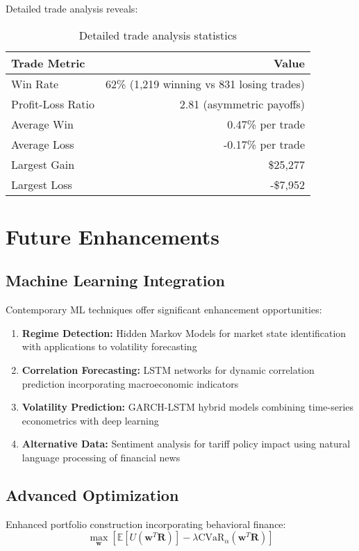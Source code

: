 \documentclass[onecolumn,11pt]{IEEEtran}
\begin{document}
Detailed trade analysis reveals:

\begin{table}[h]
\centering
\begin{tabular}{lr}
\toprule
\textbf{Trade Metric} & \textbf{Value} \\
\midrule
Win Rate & 62\% (1,219 winning vs 831 losing trades) \\
Profit-Loss Ratio & 2.81 (asymmetric payoffs) \\
Average Win & 0.47\% per trade \\
Average Loss & -0.17\% per trade \\
Largest Gain & \$25,277 \\
Largest Loss & -\$7,952 \\
\bottomrule
\end{tabular}
\caption{Detailed trade analysis statistics}
\end{table}

\section{Future Enhancements}

\subsection{Machine Learning Integration}

Contemporary ML techniques offer significant enhancement opportunities:
\begin{enumerate}
    \item \textbf{Regime Detection:} Hidden Markov Models for market state identification with applications to volatility forecasting
    \item \textbf{Correlation Forecasting:} LSTM networks for dynamic correlation prediction incorporating macroeconomic indicators
    \item \textbf{Volatility Prediction:} GARCH-LSTM hybrid models combining time-series econometrics with deep learning
    \item \textbf{Alternative Data:} Sentiment analysis for tariff policy impact using natural language processing of financial news
\end{enumerate}

\subsection{Advanced Optimization}

Enhanced portfolio construction incorporating behavioral finance:
\begin{equation}
\max_{\mathbf{w}} \left[ \mathbb{E}[U(\mathbf{w}^T \mathbf{R})] - \lambda \text{CVaR}_\alpha(\mathbf{w}^T \mathbf{R}) \right]
\end{equation}
\end{document}
